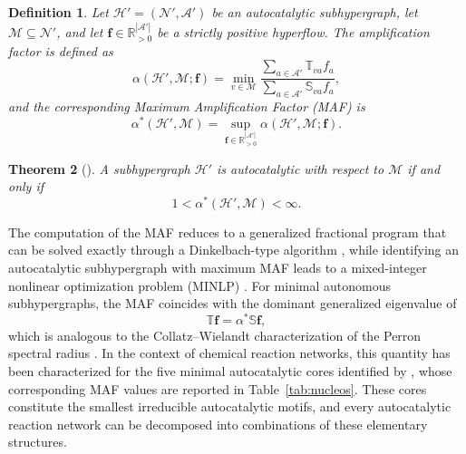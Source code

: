 \documentclass[a4paper,11pt,reqno]{amsart}
\newtheorem{definition}{Definition}[section]
\newtheorem{theorem}[definition]{Theorem}
\begin{document}
\begin{definition}
\label{def:maf}
Let $\mathcal{H}'=(\mathcal{N}',\mathcal{A}')$ be an autocatalytic subhypergraph, let $\mathcal{M}\subseteq\mathcal{N}'$, and let
$\mathbf{f}\in\mathbb{R}^{|\mathcal{A}'|}_{>0}$ be a strictly positive
hyperflow. The \emph{amplification factor} is defined as
$$
\alpha(\mathcal{H}',\mathcal{M};\mathbf{f})
=
\min_{v\in\mathcal{M}}
\frac{\displaystyle\sum_{a\in\mathcal{A}'}\mathbb{T}_{va}f_a}
{\displaystyle\sum_{a\in\mathcal{A}'}\mathbb{S}_{va}f_a},
$$
and the corresponding \emph{Maximum Amplification Factor} (MAF) is
$$
\alpha^*(\mathcal{H}',\mathcal{M})
=
\sup_{\mathbf{f}\in\mathbb{R}_{>0}^{|\mathcal{A}'|}}
\alpha(\mathcal{H}',\mathcal{M};\mathbf{f}).
$$
\end{definition}

\begin{theorem}[\cite{gonzalez2024maf}]
\label{thm:maf_char}
A subhypergraph $\mathcal{H}'$ is autocatalytic with respect to
$\mathcal{M}$ if and only if
$$
1<\alpha^*(\mathcal{H}',\mathcal{M})<\infty.
$$
\end{theorem}

The computation of the MAF reduces to a generalized fractional program that
can be solved exactly through a Dinkelbach-type algorithm
\citep{crouzeix1985}, while identifying an autocatalytic subhypergraph
with maximum MAF leads to a mixed-integer nonlinear optimization problem
(MINLP) \citep{gonzalez2024maf}. For minimal autonomous subhypergraphs,
the MAF coincides with the dominant generalized eigenvalue of
$$
\mathbb{T}\mathbf{f}
=
\alpha^*\mathbb{S}\mathbf{f},
$$
which is analogous to the Collatz--Wielandt characterization of the Perron
spectral radius \citep{gagrani2026topological}. In the context of chemical
reaction networks, this quantity has been characterized for the five
minimal autocatalytic cores identified by
\citet{blokhuis2020universal}, whose corresponding MAF values are reported
in Table~\ref{tab:nucleos}. These cores constitute the smallest
irreducible autocatalytic motifs, and every autocatalytic reaction network
can be decomposed into combinations of these elementary structures.
\end{document}
